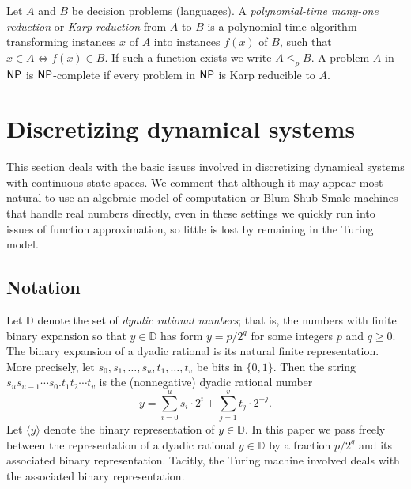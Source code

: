 \documentclass{amsart}
\theoremstyle{theorem}
\theoremstyle{remark}
\numberwithin{equation}{section}
\newcommand{\DD}{\mathbb{D}}
\newcommand{\ccNP}{\textsf{\upshape NP}}
\begin{document}
Let $A$ and $B$ be decision problems (languages). A \emph{polynomial-time many-one reduction} or \emph{Karp reduction} from $A$ to $B$ is a polynomial-time algorithm transforming instances $x$ of $A$ into instances $f(x)$ of $B$, such that $x \in A \iff f(x) \in B$. If such a function exists we write $A \leq_p B$. A problem $A$ in $\ccNP$ is $\ccNP$-complete if every problem in $\ccNP$ is Karp reducible to $A$.


\section{Discretizing dynamical systems}\label{secDiscretization}

This section deals with the basic issues involved in discretizing dynamical systems with continuous state-spaces. We comment that although it may appear most natural to use an algebraic model of computation or Blum-Shub-Smale machines that handle real numbers directly, even in these settings we quickly run into issues of function approximation, so little is lost by remaining in the Turing model.

\subsection{Notation}
Let $\DD$ denote the set of \emph{dyadic rational numbers}; that is, the numbers with finite binary expansion so that $y \in \DD$ has form $y = p/2^q$ for some integers $p$ and $q \geq 0$. The binary expansion of a dyadic rational is its natural finite representation. More precisely, let $s_0, s_1,\dots,s_u, t_1,\dots,t_v$ be bits in $\{0,1\}$. Then the string $s_us_{u-1}\cdots s_0.t_1t_2\cdots t_v$ is the (nonnegative) dyadic rational number
\[
y = \sum_{i=0}^u s_i \cdot 2^i + \sum_{j=1}^v t_j\cdot 2^{-j}.
\]
Let $\langle y \rangle$ denote the binary representation of $y \in \DD$.
In this paper we pass freely between the representation of a dyadic rational $y \in \DD$ by a fraction $p/2^q$ and its associated binary representation. Tacitly, the Turing machine involved deals with the associated binary representation.
\end{document}

